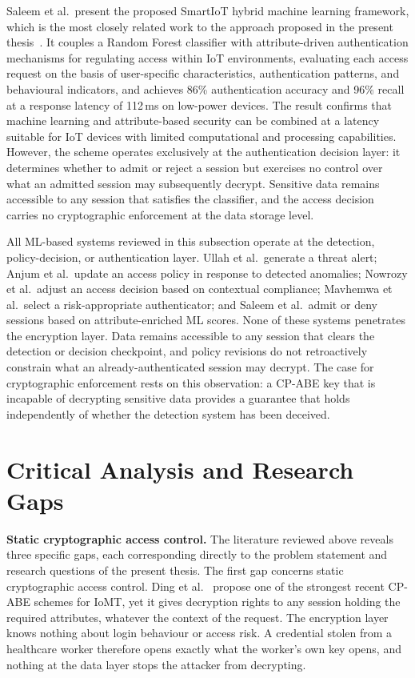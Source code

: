 Saleem et al.\ present the proposed SmartIoT hybrid machine learning framework, which is the most closely related work to the approach proposed in the present thesis~\cite{saleem2025ml}. It couples a Random Forest classifier with attribute-driven authentication mechanisms for regulating access within IoT environments, evaluating each access request on the basis of user-specific characteristics, authentication patterns, and behavioural indicators, and achieves 86\% authentication accuracy and 96\% recall at a response latency of 112\,ms on low-power devices. The result confirms that machine learning and attribute-based security can be combined at a latency suitable for IoT devices with limited computational and processing capabilities. However, the scheme operates exclusively at the authentication decision layer: it determines whether to admit or reject a session but exercises no control over what an admitted session may subsequently decrypt. Sensitive data remains accessible to any session that satisfies the classifier, and the access decision carries no cryptographic enforcement at the data storage level.

All ML-based systems reviewed in this subsection operate at the detection, policy-decision, or authentication layer. Ullah et al.\ generate a threat alert; Anjum et al.\ update an access policy in response to detected anomalies; Nowrozy et al.\ adjust an access decision based on contextual compliance; Mavhemwa et al.\ select a risk-appropriate authenticator; and Saleem et al.\ admit or deny sessions based on attribute-enriched ML scores. None of these systems penetrates the encryption layer. Data remains accessible to any session that clears the detection or decision checkpoint, and policy revisions do not retroactively constrain what an already-authenticated session may decrypt. The case for cryptographic enforcement rests on this observation: a CP-ABE key that is incapable of decrypting sensitive data provides a guarantee that holds independently of whether the detection system has been deceived.

\section{Critical Analysis and Research Gaps}
\label{sec:section_CriticalAnalysis}

\textbf{Static cryptographic access control.} The literature reviewed above reveals three specific gaps, each corresponding directly to the problem statement and research questions of the present thesis. The first gap concerns static cryptographic access control. Ding et al.~\cite{ding2026badsabe} propose one of the strongest recent CP-ABE schemes for IoMT, yet it gives decryption rights to any session holding the required attributes, whatever the context of the request. The encryption layer knows nothing about login behaviour or access risk. A credential stolen from a healthcare worker therefore opens exactly what the worker's own key opens, and nothing at the data layer stops the attacker from decrypting.

